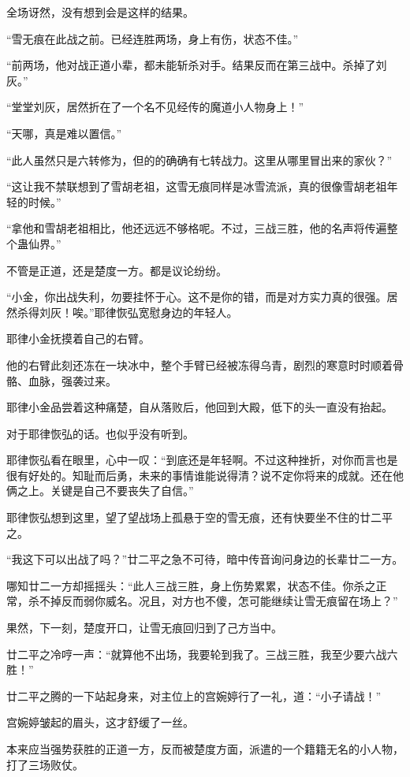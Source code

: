 \begin{this_body}
全场讶然，没有想到会是这样的结果。

“雪无痕在此战之前。已经连胜两场，身上有伤，状态不佳。”

“前两场，他对战正道小辈，都未能斩杀对手。结果反而在第三战中。杀掉了刘灰。”

“堂堂刘灰，居然折在了一个名不见经传的魔道小人物身上！”

“天哪，真是难以置信。”

“此人虽然只是六转修为，但的的确确有七转战力。这里从哪里冒出来的家伙？”

“这让我不禁联想到了雪胡老祖，这雪无痕同样是冰雪流派，真的很像雪胡老祖年轻的时候。”

“拿他和雪胡老祖相比，他还远远不够格呢。不过，三战三胜，他的名声将传遍整个蛊仙界。”

不管是正道，还是楚度一方。都是议论纷纷。

“小金，你出战失利，勿要挂怀于心。这不是你的错，而是对方实力真的很强。居然杀得刘灰！唉。”耶律恢弘宽慰身边的年轻人。

耶律小金抚摸着自己的右臂。

他的右臂此刻还冻在一块冰中，整个手臂已经被冻得乌青，剧烈的寒意时时顺着骨骼、血脉，强袭过来。

耶律小金品尝着这种痛楚，自从落败后，他回到大殿，低下的头一直没有抬起。

对于耶律恢弘的话。也似乎没有听到。

耶律恢弘看在眼里，心中一叹：“到底还是年轻啊。不过这种挫折，对你而言也是很有好处的。知耻而后勇，未来的事情谁能说得清？说不定你将来的成就。还在他俩之上。关键是自己不要丧失了自信。”

耶律恢弘想到这里，望了望战场上孤悬于空的雪无痕，还有快要坐不住的廿二平之。

“我这下可以出战了吗？”廿二平之急不可待，暗中传音询问身边的长辈廿二一方。

哪知廿二一方却摇摇头：“此人三战三胜，身上伤势累累，状态不佳。你杀之正常，杀不掉反而弱你威名。况且，对方也不傻，怎可能继续让雪无痕留在场上？”

果然，下一刻，楚度开口，让雪无痕回归到了己方当中。

廿二平之冷哼一声：“就算他不出场，我要轮到我了。三战三胜，我至少要六战六胜！”

廿二平之腾的一下站起身来，对主位上的宫婉婷行了一礼，道：“小子请战！”

宫婉婷皱起的眉头，这才舒缓了一丝。

本来应当强势获胜的正道一方，反而被楚度方面，派遣的一个籍籍无名的小人物，打了三场败仗。


\end{this_body}
